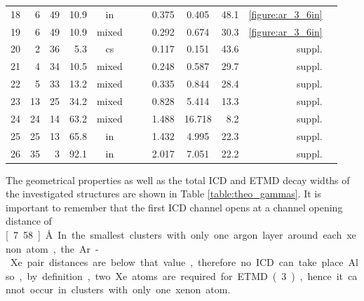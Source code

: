 \begin{table}[h]
\begin{tabular}{rrrrcccccrrr}
18 &     6 &    49 & 10.9  & in    &         &          & 0.375 & 0.405 &  48.1& \ref{figure:ar_3_6in}\\ %
19 &     6 &    49 & 10.9  & mixed &         &          & 0.292 & 0.674 &  30.3& \ref{figure:ar_3_6in}\\ %
                                                                                                 \midrule
20 &     2 &    36 &  5.3  & cs    &         &          & 0.117 & 0.151 &  43.6& suppl.\\                        %
21 &     4 &    34 & 10.5  & mixed &         &          & 0.248 & 0.587 &  29.7& suppl.\\                        %
22 &     5 &    33 & 13.2  & mixed &         &          & 0.335 & 0.844 &  28.4& suppl.\\                        %
23 &    13 &    25 & 34.2  & mixed &         &          & 0.828 & 5.414 &  13.3& suppl.\\                        %
24 &    24 &    14 & 63.2  & mixed &         &          & 1.488 &16.718 &   8.2& suppl.\\                        %
25 &    25 &    13 & 65.8  & in    &         &          & 1.432 & 4.995 &  22.3& suppl.\\                        %
26 &    35 &     3 & 92.1  & in    &         &          & 2.017 & 7.051 &  22.2& suppl.\\                        %
\bottomrule
\end{tabular}
\end{table}
%
The geometrical properties as well as the total ICD and ETMD decay widths
of the investigated structures are shown in Table \ref{table:theo_gammas}.
It is important to remember that the first ICD channel opens at a
channel opening distance of \unit[7.58]{\AA}. In the smallest
clusters with only one argon layer around each
xenon atom, the Ar-Xe pair distances are below that value, therefore 
no ICD can take place. Also, by definition, two Xe atoms are
required for ETMD(3), hence it cannot occur in clusters with only one xenon atom.

